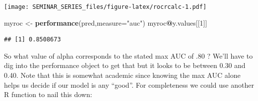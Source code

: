 \documentclass[
]{book}
\newenvironment{Shaded}{\begin{snugshade}}{\end{snugshade}}
\newcommand{\DataTypeTok}[1]{\textcolor[rgb]{0.13,0.29,0.53}{#1}}
\newcommand{\DecValTok}[1]{\textcolor[rgb]{0.00,0.00,0.81}{#1}}
\newcommand{\FloatTok}[1]{\textcolor[rgb]{0.00,0.00,0.81}{#1}}
\newcommand{\KeywordTok}[1]{\textcolor[rgb]{0.13,0.29,0.53}{\textbf{#1}}}
\newcommand{\NormalTok}[1]{#1}
\newcommand{\OperatorTok}[1]{\textcolor[rgb]{0.81,0.36,0.00}{\textbf{#1}}}
\newcommand{\OtherTok}[1]{\textcolor[rgb]{0.56,0.35,0.01}{#1}}
\newcommand{\StringTok}[1]{\textcolor[rgb]{0.31,0.60,0.02}{#1}}
\begin{document}
\begin{Shaded}
\end{Shaded}

\texttt{[image: SEMINAR\_SERIES\_files/figure-latex/rocrcalc-1.pdf]}

\begin{Shaded}
\begin{Highlighting}[]
\NormalTok{myroc <-}\StringTok{ }\KeywordTok{performance}\NormalTok{(pred,}\DataTypeTok{measure=}\StringTok{"auc"}\NormalTok{)}
\NormalTok{myroc}\OperatorTok{@}\NormalTok{y.values[[}\DecValTok{1}\NormalTok{]]}
\end{Highlighting}
\end{Shaded}

\begin{verbatim}
## [1] 0.8508673
\end{verbatim}

So what value of alpha corresponds to the stated max AUC of .80 ? We'll have to dig into the performance object to get that but it looks to be between 0.30 and 0.40. Note that this is somewhat academic since knowing the max AUC alone helps us decide if our model is any ``good''. For completeness we could use another R function to nail this down:

\begin{Shaded}
\end{Shaded}
\end{document}
